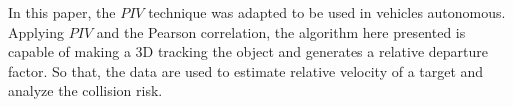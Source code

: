 In this paper, the $PIV$ technique was adapted to be used in vehicles autonomous.
Applying $PIV$ and the Pearson correlation, the algorithm here presented 
is capable of making a 3D tracking the object and generates a relative departure factor. 
So that, the data are used to estimate relative velocity  of a target and analyze the 
collision risk.
